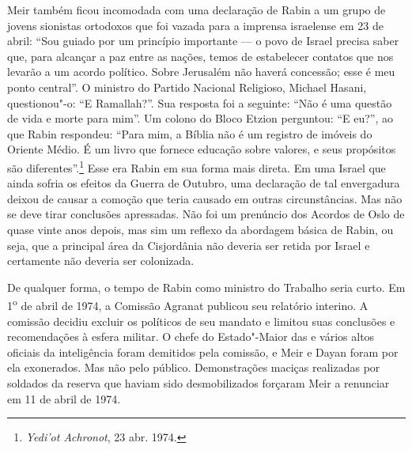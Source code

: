 Meir também ficou incomodada com uma declaração de Rabin a um grupo de
jovens sionistas ortodoxos que foi vazada para a imprensa israelense em
23 de abril: ``Sou guiado por um princípio importante --- o povo de
Israel precisa saber que, para alcançar a paz entre as nações, temos de
estabelecer contatos que nos levarão a um acordo político. Sobre
Jerusalém não haverá concessão; esse é meu ponto central''. O ministro do Partido Nacional Religioso, Michael Hasani, questionou"-o:
``E Ramallah?''. Sua resposta foi a seguinte: ``Não é uma questão de vida e morte para
mim''. Um colono do Bloco Etzion perguntou: ``E eu?'', ao que Rabin
respondeu: ``Para mim, a Bíblia não é um registro de imóveis do Oriente
Médio. É um livro que fornece educação sobre valores, e seus propósitos
são diferentes''.\footnote{\emph{Yedi'ot Achronot}, 23 abr. 1974.} Esse era Rabin em sua forma mais direta. Em
uma Israel que ainda sofria os efeitos da Guerra de Outubro, uma
declaração de tal envergadura deixou de causar a comoção que teria
causado em outras circunstâncias. Mas não se deve tirar conclusões
apressadas. Não foi um prenúncio dos Acordos de Oslo de quase vinte anos
depois, mas sim um reflexo da abordagem básica de Rabin, ou seja, que a
principal área da Cisjordânia não deveria ser retida por Israel e
certamente não deveria ser colonizada.

De qualquer forma, o tempo de Rabin como ministro do Trabalho seria
curto. Em 1\textsuperscript{o} de abril de 1974, a Comissão Agranat
publicou seu relatório interino. A comissão decidiu excluir os políticos
de seu mandato e limitou suas conclusões e recomendações à esfera
militar. O chefe do Estado"-Maior das  e vários altos oficiais da
inteligência foram demitidos pela comissão, e Meir e Dayan foram por ela
exonerados. Mas não pelo público. Demonstrações maciças realizadas por
soldados da reserva que haviam sido desmobilizados forçaram Meir a
renunciar em 11 de abril de 1974.

